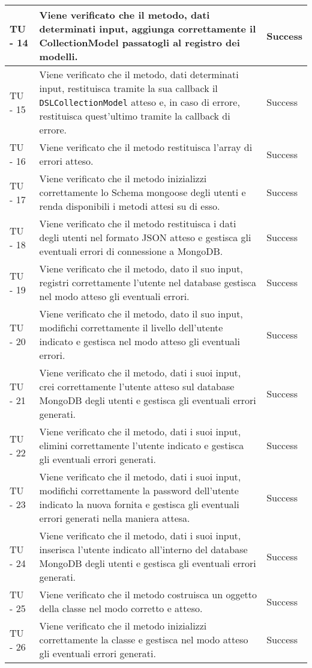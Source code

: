 \begin{center}
\begin{longtable}{ | p{3cm} | p{9cm} | p{2cm} | }
TU - 14 & Viene verificato che il metodo, dati determinati input, aggiunga correttamente il CollectionModel passatogli al registro dei modelli. & Success \\ \hline
TU - 15 & Viene verificato che il metodo, dati determinati input, restituisca tramite la sua callback il \texttt{DSLCollectionModel} atteso e, in caso di errore, restituisca quest'ultimo tramite la callback di errore. & Success \\ \hline
TU - 16 & Viene verificato che il metodo restituisca l'array di errori atteso. & Success \\ \hline
TU - 17 & Viene verificato che il metodo inizializzi correttamente lo Schema mongoose degli utenti e renda disponibili i metodi attesi su di esso. & Success \\ \hline
TU - 18 & Viene verificato che il metodo restituisca i dati degli utenti nel formato JSON atteso e gestisca gli eventuali errori di connessione a MongoDB. & Success \\ \hline
TU - 19 & Viene verificato che il metodo, dato il suo input, registri correttamente l'utente nel database gestisca nel modo atteso gli eventuali errori. & Success \\ \hline
TU - 20 & Viene verificato che il metodo, dato il suo input, modifichi correttamente il livello dell'utente indicato e gestisca nel modo atteso gli eventuali errori. & Success \\ \hline
TU - 21 & Viene verificato che il metodo, dati i suoi input, crei correttamente l'utente atteso sul database MongoDB degli utenti e gestisca gli eventuali errori generati. & Success \\ \hline
TU - 22 & Viene verificato che il metodo, dati i suoi input, elimini correttamente l'utente indicato e gestisca gli eventuali errori generati. & Success \\ \hline
TU - 23 & Viene verificato che il metodo, dati i suoi input, modifichi correttamente la password dell'utente indicato la nuova fornita e gestisca gli eventuali errori generati nella maniera attesa. & Success \\ \hline
TU - 24 & Viene verificato che il metodo, dati i suoi input, inserisca l'utente indicato all'interno del database MongoDB degli utenti e gestisca gli eventuali errori generati. & Success \\ \hline
TU - 25 & Viene verificato che il metodo costruisca un oggetto della classe nel modo corretto e atteso. & Success \\ \hline
TU - 26 & Viene verificato che il metodo inizializzi correttamente la classe e gestisca nel modo atteso gli eventuali errori generati. & Success \\ \hline

\end{longtable}
\end{center}
